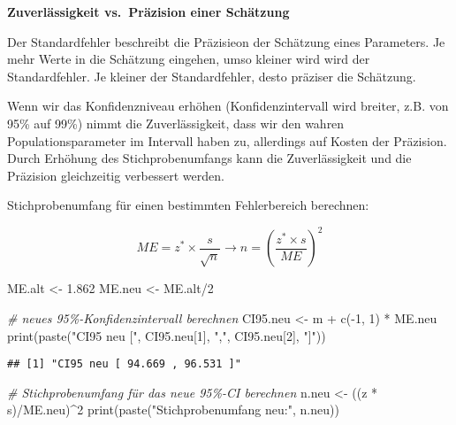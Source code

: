 \documentclass[
]{book}
\newenvironment{Shaded}{\begin{snugshade}}{\end{snugshade}}
\newcommand{\CommentTok}[1]{\textcolor[rgb]{0.56,0.35,0.01}{\textit{#1}}}
\newcommand{\DecValTok}[1]{\textcolor[rgb]{0.00,0.00,0.81}{#1}}
\newcommand{\FloatTok}[1]{\textcolor[rgb]{0.00,0.00,0.81}{#1}}
\newcommand{\FunctionTok}[1]{\textcolor[rgb]{0.00,0.00,0.00}{#1}}
\newcommand{\NormalTok}[1]{#1}
\newcommand{\OtherTok}[1]{\textcolor[rgb]{0.56,0.35,0.01}{#1}}
\newcommand{\SpecialCharTok}[1]{\textcolor[rgb]{0.00,0.00,0.00}{#1}}
\newcommand{\StringTok}[1]{\textcolor[rgb]{0.31,0.60,0.02}{#1}}
\begin{document}
\textbf{Zuverlässigkeit vs.~Präzision einer Schätzung}

Der Standardfehler beschreibt die Präzisieon der Schätzung eines Parameters. Je mehr Werte in die Schätzung eingehen, umso kleiner wird wird der Standardfehler. Je kleiner der Standardfehler, desto präziser die Schätzung.

Wenn wir das Konfidenzniveau erhöhen (Konfidenzintervall wird breiter, z.B. von 95\% auf 99\%) nimmt die Zuverlässigkeit, dass wir den wahren Populationsparameter im Intervall haben zu, allerdings auf Kosten der Präzision. Durch Erhöhung des Stichprobenumfangs kann die Zuverlässigkeit und die Präzision gleichzeitig verbessert werden.

Stichprobenumfang für einen bestimmten Fehlerbereich berechnen:

\begin{equation}
  ME = z^* \times \frac{s}{\sqrt{n}} \rightarrow n = (\frac{z^* \times s}{ME})^2
  \label{eq:nausME}
\end{equation}

\begin{Shaded}
\begin{Highlighting}[]
\NormalTok{ME.alt }\OtherTok{\textless{}{-}} \FloatTok{1.862}
\NormalTok{ME.neu }\OtherTok{\textless{}{-}}\NormalTok{ ME.alt}\SpecialCharTok{/}\DecValTok{2}

\CommentTok{\# neues 95\%{-}Konfidenzintervall berechnen}
\NormalTok{CI95.neu }\OtherTok{\textless{}{-}}\NormalTok{ m }\SpecialCharTok{+} \FunctionTok{c}\NormalTok{(}\SpecialCharTok{{-}}\DecValTok{1}\NormalTok{, }\DecValTok{1}\NormalTok{) }\SpecialCharTok{*}\NormalTok{ ME.neu}
\FunctionTok{print}\NormalTok{(}\FunctionTok{paste}\NormalTok{(}\StringTok{"CI95 neu ["}\NormalTok{, CI95.neu[}\DecValTok{1}\NormalTok{], }\StringTok{","}\NormalTok{, CI95.neu[}\DecValTok{2}\NormalTok{], }\StringTok{"]"}\NormalTok{))}
\end{Highlighting}
\end{Shaded}

\begin{verbatim}
## [1] "CI95 neu [ 94.669 , 96.531 ]"
\end{verbatim}

\begin{Shaded}
\begin{Highlighting}[]
\CommentTok{\# Stichprobenumfang für das neue 95\%{-}CI berechnen}
\NormalTok{n.neu }\OtherTok{\textless{}{-}}\NormalTok{ ((z }\SpecialCharTok{*}\NormalTok{ s)}\SpecialCharTok{/}\NormalTok{ME.neu)}\SpecialCharTok{\^{}}\DecValTok{2}
\FunctionTok{print}\NormalTok{(}\FunctionTok{paste}\NormalTok{(}\StringTok{"Stichprobenumfang neu:"}\NormalTok{, n.neu))}
\end{Highlighting}
\end{Shaded}
\end{document}

